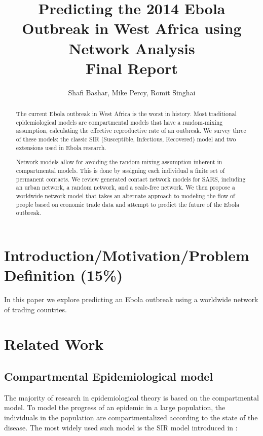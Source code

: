 \documentclass[10pt, journal,onecolumn]{IEEEtran}
\title{Predicting the 2014 Ebola Outbreak in West Africa using Network Analysis \\
       {\large Final Report} }
\author{Shafi Bashar, Mike Percy, Romit  Singhai}
\affil{\textit {\{shafiab, mp81, romit\}@stanford.edu}}
\begin{document}
\maketitle

\begin{abstract}
The current Ebola outbreak in West Africa is the worst in history.
Most traditional epidemiological models are compartmental models that have a random-mixing
assumption, calculating the effective reproductive rate of an outbreak.
We survey three of these models: the classic
SIR (Susceptible, Infectious, Recovered) model and two extensions used in Ebola research.

Network models allow for avoiding the random-mixing
assumption inherent in compartmental models.
This is done by assigning each individual a finite set of permanent contacts.
We review generated contact network models for SARS, including an urban network, a random network, and
a scale-free network.
We then propose a worldwide network model that takes an alternate approach to modeling
the flow of people based on economic trade data and attempt to predict the future
of the Ebola outbreak.

\end{abstract}




\section{Introduction/Motivation/Problem Definition (15\%)}
\label{sec:Introduction}

In this paper we explore predicting an Ebola outbreak using a worldwide network of trading countries.




\section{Related Work}
\label{sec:RelatedWork}

\subsection{\textbf{Compartmental Epidemiological model}}
\label{SubSec:SIR}

The majority of research in epidemiological theory is based on the compartmental model. To model the progress of an epidemic in a large population, the individuals in the population are compartmentalized according to the state of the disease. The most widely used such model is the SIR model introduced in \citep{very_old_paper}:
\end{document}
